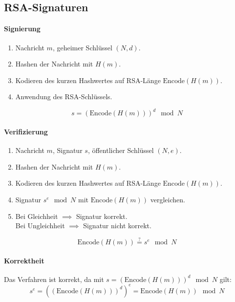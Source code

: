 	\subsection{RSA-Signaturen}
		\paragraph{Signierung}
			\begin{enumerate}
				\item[] Nachricht \(m\), geheimer Schlüssel \((N, d)\).
				\item Hashen der Nachricht mit \(H(m)\).
				\item Kodieren des kurzen Hashwertes auf RSA-Länge \(\text{Encode}(H(m))\).
				\item Anwendung des RSA-Schlüssels.
			\end{enumerate}
			\begin{equation*}
				s = (\text{Encode}(H(m))) ^ d \mod N
			\end{equation*}

		\paragraph{Verifizierung}
			\begin{enumerate}
				\item[] Nachricht \(m\), Signatur \(s\), öffentlicher Schlüssel \((N, e)\).
				\item Hashen der Nachricht mit \(H(m)\).
				\item Kodieren des kurzen Hashwertes auf RSA-Länge \(\text{Encode}(H(m))\).
				\item Signatur \( s^e \mod N \) mit \(\text{Encode}(H(m))\) vergleichen.
				\item Bei Gleichheit \(\implies\) Signatur korrekt. \\
					Bei Ungleichheit \(\implies\) Signatur nicht korrekt.
			\end{enumerate}
			\begin{equation*}
				\text{Encode}(H(m)) \overset{?}{=} s ^ e \mod N
			\end{equation*}

		\paragraph{Korrektheit}
			Das Verfahren ist korrekt, da mit \( s = (\text{Encode}(H(m))) ^ d \mod N \) gilt:
			\begin{equation*}
				s^e = ((\text{Encode}(H(m))) ^ d) ^ e = \text{Encode}(H(m)) \mod N
			\end{equation*}

